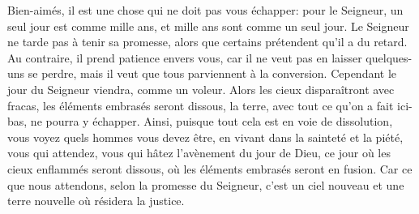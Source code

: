 Bien-aimés, il est une chose qui ne doit pas vous échapper:
	pour le Seigneur, un seul jour est comme mille ans,
	et mille ans sont comme un seul jour.
Le Seigneur ne tarde pas à tenir sa promesse,
	alors que certains prétendent qu’il a du retard.
Au contraire, il prend patience envers vous,
	car il ne veut pas en laisser quelques-uns se perdre,
	mais il veut que tous parviennent à la conversion.
Cependant le jour du Seigneur viendra, comme un voleur.
Alors les cieux disparaîtront avec fracas,
	les éléments embrasés seront dissous,
	la terre, avec tout ce qu’on a fait ici-bas, ne pourra y échapper.
Ainsi, puisque tout cela est en voie de dissolution,
	vous voyez quels hommes vous devez être,
	en vivant dans la sainteté et la piété,
	vous qui attendez, vous qui hâtez l’avènement du jour de Dieu,
	ce jour où les cieux enflammés seront dissous,
	où les éléments embrasés seront en fusion.
Car ce que nous attendons, selon la promesse du Seigneur,
	c’est un ciel nouveau et une terre nouvelle où résidera la justice.
